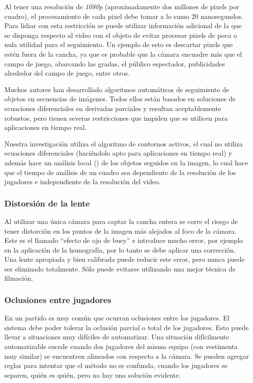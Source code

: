 Al tener una resolución de \textit{1080p} (aproximadamente dos millones de
pixels por cuadro), el procesamiento de cada pixel debe tomar a lo sumo 20
nanosegundos.  Para lidiar con esta restricción se puede utilizar información
adicional de la que se disponga respecto al video con el objeto de evitar
procesar pixels de poca o nula utilidad para el seguimiento. Un ejemplo de esto
es descartar pixels que estén fuera de la cancha, ya que es probable que la
cámara encuadre más que el campo de juego, abarcando las gradas, el público
espectador, publicidades alrededor del campo de juego, entre otros.

Muchos autores han desarrollado algoritmos automáticos de seguimiento de
objetos en secuencias de imágenes\cite{IFTrace, alp, local-learning, MHT-2}.
Todos ellos están basados en soluciones de ecuaciones diferenciales en
derivadas parciales y resultan aceptablemente robustos, pero tienen severas
restricciones que impiden que se utilicen para aplicaciones en tiempo real.

Nuestra investigación utiliza el algoritmo de contornos
activos\cite{fast-level-set}, el cual no utiliza ecuaciones diferenciales
(haciéndolo apto para aplicaciones en tiempo real) y además hace un análisis
local () de los objetos seguidos en la imagen, lo cual hace que el tiempo de
análisis de un cuadro sea dependiente de la resolución de los jugadores e
independiente de la resolución del video.

\subsubsection{Distorsión de la lente}

Al utilizar una única cámara para captar la cancha entera se corre el riesgo de
tener distorción en los puntos de la imagen más alejados al foco de la cámara.
Este es el llamado ``efecto de ojo de buey'' e introduce mucho error, por ejemplo
en la aplicación de la homografía, por lo
tanto se debe aplicar una corrección. Una lente apropiada y bien calibrada
puede reducir este error, pero nunca puede ser eliminado totalmente. Sólo
puede evitarse utilizando una mejor técnica de filmación.

\subsubsection{Oclusiones entre jugadores}

En un partido es muy común que ocurran oclusiones entre los jugadores. El
sistema debe poder tolerar la oclusión parcial o total de los jugadores.
Esto puede llevar a situaciones muy difíciles de automatizar. Una situación
difícilmente automatizable sucede cuando dos jugadores del mismo equipo (con
vestimenta muy similar) se encuentren alineados con respecto a la cámara.
Se pueden agregar reglas para intentar que el método no se confunda, cuando
los jugadores se separen, quién es quién, pero no hay una solución evidente.

